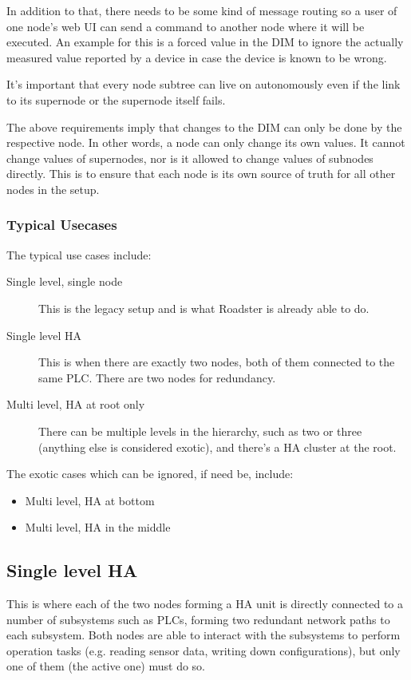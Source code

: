 In addition to that, there needs to be some kind of message routing so a user
of one node's web UI can send a command to another node where it will be
executed. An example for this is a forced value in the DIM to ignore the
actually measured value reported by a device in case the device is known to be
wrong.

It's important that every node subtree can live on autonomously even if the
link to its supernode or the supernode itself fails.

The above requirements imply that changes to the DIM can only be done by the
respective node. In other words, a node can only change its own values. It
cannot change values of supernodes, nor is it allowed to change values of
subnodes directly. This is to ensure that each node is its own source of truth
for all other nodes in the setup.


\subsubsection{Typical Usecases}
The typical use cases include:

\begin{description}
	\item [ Single level, single node ]
		This is the legacy setup and is what Roadster is already able to do.

	\item [ Single level \gls{HA} ]
		This is when there are exactly two nodes, both of them
		connected to the same PLC. There are two nodes for redundancy.

	\item [ Multi level, \gls{HA} at root only ]
		There can be multiple levels in the hierarchy, such as two or
		three (anything else is considered exotic), and there's a HA
		cluster at the root.
\end{description}


The exotic cases which can be ignored, if need be, include:

\begin{itemize}
	\item Multi level, HA at bottom
	\item Multi level, HA in the middle
\end{itemize}


\subsection{Single level HA}
This is where each of the two nodes forming a HA unit is directly connected to a number of
subsystems such as \glspl{PLC}, forming two redundant network paths to each
subsystem. Both nodes are able to interact with the subsystems to perform
operation tasks (e.g. reading sensor data, writing down configurations), but
only one of them (the active one) must do so.

